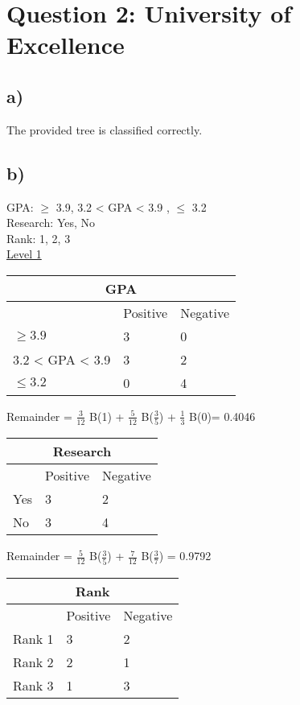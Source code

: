 \section*{Question 2: University of Excellence}
\subsection*{a)} 
The provided tree is classified correctly.

\subsection*{b)}
GPA: $\geq$ 3.9, 3.2 < GPA < 3.9 , $\leq$ 3.2\\
Research: Yes, No\\
Rank: 1, 2, 3\\

\underline{Level 1}

\begin{tabular}{ |p{3cm}||p{3cm}|p{3cm}| }
 \hline
 \multicolumn{3}{|c|}{GPA} \\
 \hline
 & Positive & Negative\\
 \hline
 $\geq 3.9$  & 3 & 0\\
 3.2 < GPA < 3.9 &   3 & 2\\
 $\leq 3.2$ & 0 & 4\\
 \hline
\end{tabular}

Remainder = $\frac{3}{12}$ B(1) + $\frac{5}{12}$ B($\frac{3}{5}$)  + $\frac{1}{3}$ B(0)= 0.4046\\

\begin{tabular}{ |p{3cm}||p{3cm}|p{3cm}| }
 \hline
 \multicolumn{3}{|c|}{Research} \\
 \hline
 & Positive & Negative\\
 \hline
 Yes & 3 & 2\\
 No &   3 & 4\\
 \hline
\end{tabular}

Remainder = $\frac{5}{12}$ B($\frac{3}{5}$) + $\frac{7}{12}$ B($\frac{3}{7}$) = 0.9792\\

\begin{tabular}{ |p{3cm}||p{3cm}|p{3cm}| }
 \hline
 \multicolumn{3}{|c|}{Rank} \\
 \hline
 & Positive & Negative\\
 \hline
 Rank 1 & 3 & 2\\
 Rank 2 &   2 & 1\\
 Rank 3 &   1 & 3\\
 \hline
\end{tabular}

